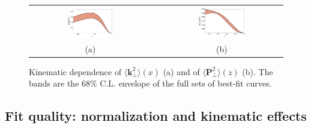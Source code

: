 \documentclass[aps,preprintnumbers,showpacs,nofootinbib,superscriptaddress,floatfix]{revtex4}
\newcommand{\T}{\perp}
\begin{document}
\begin{figure}[h!]
\centering
\begin{tabular}{ccc}
\includegraphics[width=0.40\textwidth]{plots/kT2av_compare.pdf}
&\hspace{0.001cm}
&
\includegraphics[width=0.40\textwidth]{plots/PT2av_compare.pdf}
\\
(a) && (b)
\end{tabular}
\caption{Kinematic dependence of $\big \langle \bm{k}_{\T}^2 \big \rangle (x)$
  (a) and of $\big \langle \bm{P}_{\perp}^2 \big \rangle (z)$ (b). The bands
  are the $68\%$ C.L. envelope of the full sets of best-fit
  curves.  
}
\label{f:avmomenta_68CL}
\end{figure}


\subsection{Fit quality: normalization and kinematic effects}
\label{ss:replica105}
\end{document}
